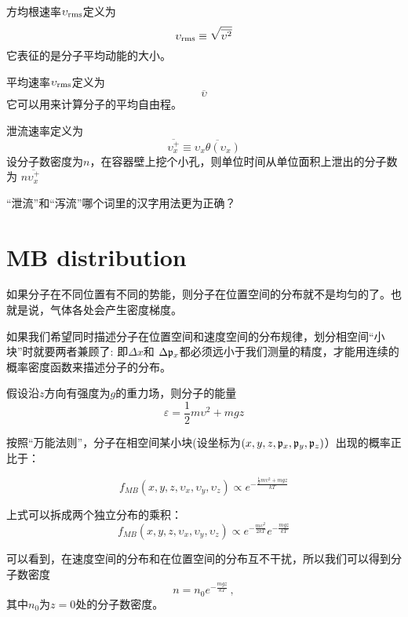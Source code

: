 \documentclass[CJK]{beamer}
\begin{document}
\begin{frame}
\bch
方均根速率$\upsilon_{\rm rms}$定义为
$$\upsilon_{\rm rms} \equiv \sqrt{\overline{\upsilon^2}}$$
它表征的是分子平均动能的大小。
\ech
\end{frame}


\begin{frame}
\bch
平均速率$\upsilon_{\rm rms}$定义为$$\overline{\upsilon}$$
它可以用来计算分子的平均自由程。
\ech
\end{frame}


\begin{frame}
\bch
泄流速率定义为
$$\overline{\upsilon_x^+} \equiv \overline{\upsilon_x\theta(\upsilon_x)}$$
设分子数密度为$n$，在容器壁上挖个小孔，则单位时间从单位面积上泄出的分子数为
$n \overline{\upsilon_x^+}$
\ech
\end{frame}

\begin{frame}
\bch
{}
“泄流”和“泻流”哪个词里的汉字用法更为正确？
\ech
\end{frame}


\section{MB distribution}

\begin{frame}
\bch
\bitem
\item{如果分子在不同位置有不同的势能，则分子在位置空间的分布就不是均匀的了。也就是说，气体各处会产生密度梯度。}
\item{如果我们希望同时描述分子在位置空间和速度空间的分布规律，划分相空间“小块”时就要两者兼顾了: 即$\Delta x$和
$\Delta {\mathfrak{p}}_x$都必须远小于我们测量的精度，才能用连续的概率密度函数来描述分子的分布。}
\eitem
\ech
\end{frame}


\begin{frame}
\bch
假设沿$z$方向有强度为$g$的重力场，则分子的能量
$$\varepsilon = \frac{1}{2}m\upsilon^2 + mgz$$

按照“万能法则”，分子在相空间某小块(设坐标为$(x, y, z, {\mathfrak{p}}_x, {\mathfrak{p}}_y, {\mathfrak{p}}_z)$）出现的概率正比于：

$$f_{MB}(x, y, z, \upsilon_x, \upsilon_y,\upsilon_z) \propto e^{-\frac{\frac{1}{2}m\upsilon^2 + mgz}{kT}}$$

上式可以拆成两个独立分布的乘积：
$$f_{MB}(x, y, z, \upsilon_x, \upsilon_y,\upsilon_z) \propto e^{-\frac{m\upsilon^2}{2kT}} e^{-\frac{mgz}{kT}}$$

可以看到，在速度空间的分布和在位置空间的分布互不干扰，所以我们可以得到分子数密度
$$n = n_0 e^{-\frac{mgz}{kT}}\, ,$$
其中$n_0$为$z=0$处的分子数密度。
\ech
\end{frame}
\end{document}
